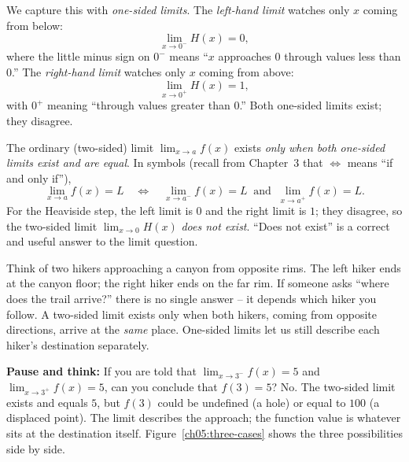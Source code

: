 We capture this with \emph{one-sided limits}. The \emph{left-hand limit} watches only $x$
coming from below:
\[
  \lim_{x \to 0^-} H(x) = 0,
\]
where the little minus sign on $0^-$ means ``$x$ approaches $0$ through values less than $0$.''
The \emph{right-hand limit} watches only $x$ coming from above:
\[
  \lim_{x \to 0^+} H(x) = 1,
\]
with $0^+$ meaning ``through values greater than $0$.'' Both one-sided limits exist; they
disagree.

\begin{focusbox}
The ordinary (two-sided) limit $\lim_{x\to a} f(x)$ exists \emph{only when both one-sided limits
exist and are equal}. In symbols (recall from Chapter~3 that $\Longleftrightarrow$ means ``if and only
if''),
\[
  \lim_{x \to a} f(x) = L
  \quad\Longleftrightarrow\quad
  \lim_{x \to a^-} f(x) = L \ \text{ and }\ \lim_{x \to a^+} f(x) = L.
\]
For the Heaviside step, the left limit is $0$ and the right limit is $1$; they disagree, so the
two-sided limit $\lim_{x\to 0} H(x)$ \emph{does not exist}. ``Does not exist'' is a correct and
useful answer to the limit question.
\end{focusbox}

\begin{intuitionbox}
Think of two hikers approaching a canyon from opposite rims. The left hiker ends at the canyon
floor; the right hiker ends on the far rim. If someone asks ``where does the trail arrive?''
there is no single answer -- it depends which hiker you follow. A two-sided limit exists only
when both hikers, coming from opposite directions, arrive at the \emph{same} place. One-sided
limits let us still describe each hiker's destination separately.
\end{intuitionbox}

\begin{recoverybox}
\textbf{Pause and think:} If you are told that $\lim_{x\to 3^-} f(x) = 5$ and $\lim_{x\to 3^+} f(x) = 5$,
can you conclude that $f(3) = 5$? No. The two-sided limit exists and equals $5$, but $f(3)$ could be
undefined (a hole) or equal to $100$ (a displaced point). The limit describes the approach; the function
value is whatever sits at the destination itself. Figure~\ref{ch05:three-cases} shows the three
possibilities side by side.
\end{recoverybox}

